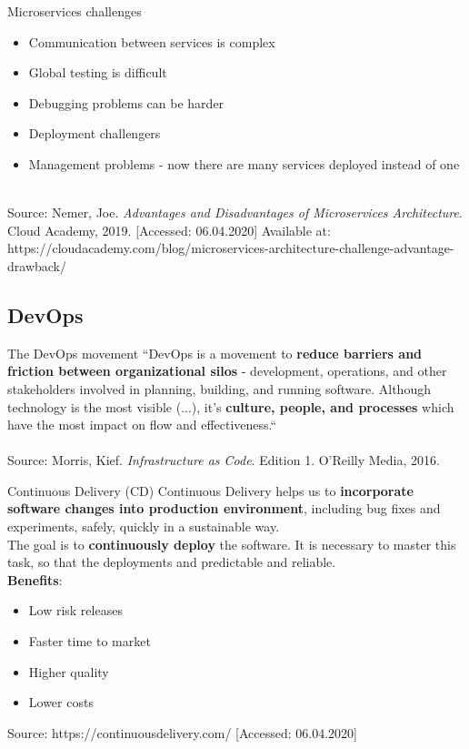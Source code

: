 \documentclass{beamer}
\begin{document}
\begin{frame}{Microservices challenges}%
\begin{itemize}
	\item Communication between services is complex
	\item Global testing is difficult
	\item Debugging problems can be harder
	\item Deployment challengers
	\item Management problems - now there are many services deployed instead of one
\end{itemize}
~\\
\tiny{Source: Nemer, Joe. \textit{Advantages and Disadvantages of Microservices Architecture}. Cloud Academy, 2019. [Accessed: 06.04.2020] Available at: https://cloudacademy.com/blog/microservices-architecture-challenge-advantage-drawback/} 
\end{frame}

\subsection{DevOps}
\begin{frame}{The DevOps movement}%
``DevOps is a movement to \textbf{reduce barriers and friction between organizational silos} - development, operations, and other stakeholders involved in planning, building, and running software. Although technology is the most visible (...), it’s \textbf{culture, people, and processes} which have the most impact on flow and effectiveness.``
\\
~\\
\tiny{Source: Morris, Kief. \textit{Infrastructure as Code}. Edition 1. O'Reilly Media, 2016.} 
\end{frame}

\begin{frame}{Continuous Delivery (CD)}%
Continuous Delivery helps us to \textbf{incorporate software changes into production environment}, including bug fixes and experiments, safely, quickly in a sustainable way.
\\
The goal is to \textbf{continuously deploy} the software. It is necessary to master this task, so that the deployments and predictable and reliable.
\\
\textbf{Benefits}:
\begin{itemize}
	\item Low risk releases
	\item Faster time to market
	\item Higher quality
	\item Lower costs
\end{itemize}
\tiny{Source: https://continuousdelivery.com/ [Accessed: 06.04.2020]} 
\end{frame}
\end{document}
